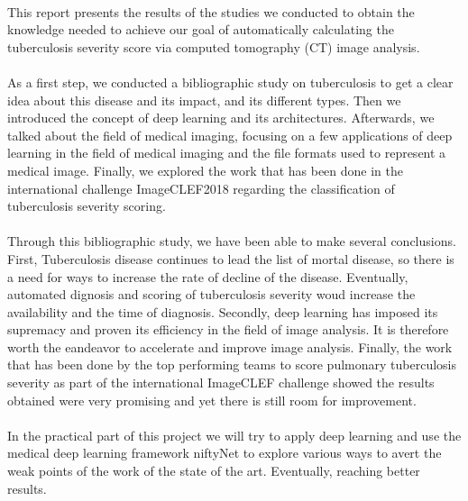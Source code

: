 \paragraph{}
This report presents the results of the studies we conducted to obtain the knowledge needed to achieve our goal of automatically calculating the tuberculosis severity score via computed tomography (CT) image analysis.
\paragraph{}
As a first step, we conducted a bibliographic study on tuberculosis to get a clear idea about this disease and its impact, and its different types. Then we introduced the concept of deep learning and its architectures. Afterwards, we talked about the field of medical imaging, focusing on a few applications of deep learning in the field of medical imaging and the file formats used to represent a medical image. Finally, we explored the work that has been done in the international challenge ImageCLEF2018\cite{ImageCLEF:1} regarding the classification of tuberculosis severity scoring.
\paragraph{}
Through this bibliographic study, we have been able to make several conclusions. First, Tuberculosis disease continues to lead the list of mortal disease, so there is a need for ways to increase the rate of decline of the disease. Eventually, automated dignosis and scoring of tuberculosis severity woud increase the availability and the time of diagnosis. Secondly, deep learning has imposed its supremacy and proven its efficiency in the field of image analysis. It is therefore worth the eandeavor to accelerate and improve image analysis. Finally, the work that has been done by the top performing teams to score pulmonary tuberculosis severity as part of the international ImageCLEF challenge showed the results obtained were very promising and yet there is still room for improvement.
\paragraph{}
In the practical part of this project we will try to apply deep learning and use the medical deep learning framework niftyNet to explore various ways to avert the weak points of the work of the state of the art. Eventually, reaching better results. 
